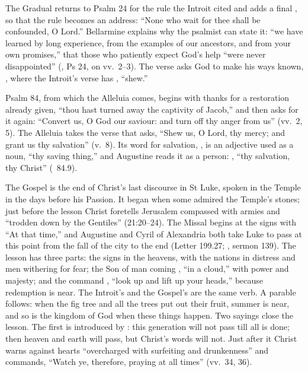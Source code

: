 The Gradual returns to Psalm 24 for the rule the Introit cited and adds a
final , so that the rule becomes an address: ``None who wait for
thee shall be confounded, O Lord.'' Bellarmine explains why the psalmist can
state it: ``we have learned by long experience, from the examples of our
ancestors, and from your own promises,'' that those who patiently expect God's
help ``were never disappointed'' (, Ps 24, on vv.~2--3). The
verse asks God to make his ways known, , where the
Introit's verse has , ``shew.''

Psalm 84, from which the Alleluia comes, begins with thanks for a
restoration already given, ``thou hast turned away the captivity of Jacob,''
and then asks for it again: ``Convert us, O God our saviour: and turn off thy
anger from us'' (vv.~2, 5). The Alleluia takes the verse that asks, ``Shew us,
O Lord, thy mercy; and grant us thy salvation'' (v.~8). Its word
for salvation, , is an adjective used as a noun, ``thy saving
thing,'' and Augustine reads it as a person: , ``thy salvation, thy Christ'' (~84.9).

The Gospel is the end of Christ's last discourse in St Luke, spoken in the
Temple in the days before his Passion. It began when some admired the
Temple's stones; just before the lesson Christ foretells Jerusalem compassed
with armies and ``trodden down by the Gentiles'' (21:20--24). The Missal
begins at the signs with ``At that time,'' and Augustine and Cyril of
Alexandria both take Luke to pass at this point from the fall of the city to
the end (Letter 199.27; , sermon 139). The lesson has three parts: the signs in the heavens, with the
nations in distress and men withering for fear; the Son of man coming
, ``in a cloud,'' with power and majesty; and the command
, ``look up and lift up your
heads,'' because redemption is near. The Introit's  and the
Gospel's  are the same verb. A parable follows: when the fig
tree and all the trees put out their fruit, summer is near, and so is the
kingdom of God when these things happen. Two sayings close the lesson. The
first is introduced by : this generation will not pass till all
is done; then heaven and earth will pass, but Christ's words will not. Just
after it Christ warns
against hearts ``overcharged with surfeiting and drunkenness'' and commands,
``Watch ye, therefore, praying at all times'' (vv.~34, 36).

